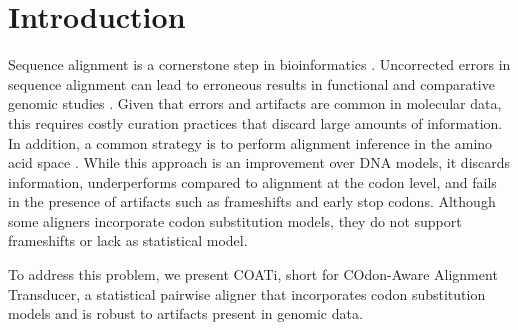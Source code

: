 \section{Introduction}

Sequence alignment is a cornerstone step in bioinformatics
\parencite{sequence_alignment_rosenberg_2009}.
Uncorrected errors in sequence alignment can lead to erroneous results in
functional and comparative genomic studies \parencite{estimates_schneider_2009}.
Given that errors and artifacts are common in molecular data, this requires
costly curation practices that discard large amounts of information.
In addition, a common strategy is to perform alignment inference in the amino
acid space \parencite{bininda2005transalign,abascal2010translatorx}.
While this approach is an improvement over DNA models, it discards information,
underperforms compared to alignment at the codon level, and fails in the
presence of artifacts such as frameshifts and early stop codons.
Although some aligners incorporate codon substitution models, they do not
support frameshifts or lack as statistical model.

To address this problem, we present COATi, short for COdon-Aware Alignment
Transducer, a statistical pairwise aligner that incorporates codon substitution
models and is robust to artifacts present in genomic data.

